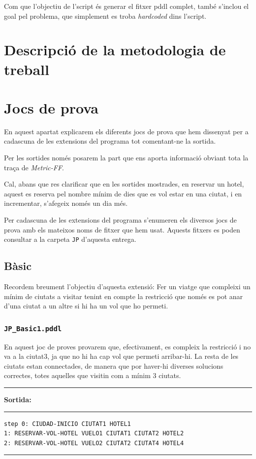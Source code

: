\documentclass[11pt,a4paper]{article}
\begin{document}
Com que l'objectiu de l'script és generar el fitxer pddl complet, també s'inclou el goal pel problema, que simplement es troba \emph{hardcoded} dins l'script.

\section{Descripció de la metodologia de treball}


\section{Jocs de prova}

En aquest apartat explicarem els diferents jocs de prova que hem dissenyat per a cadascuna de les extensions del programa tot comentant-ne la sortida.

Per les sortides només posarem la part que ens aporta informació obviant tota la traça de \emph{Metric-FF}. 

Cal, abans que res clarificar que en les sortides mostrades, en reservar un hotel, aquest es reserva pel nombre mínim de dies que es vol estar en una ciutat, i en incrementar, s'afegeix només un dia més.

Per cadascuna de les extensions del programa s'enumeren els diversos jocs de prova amb els mateixos noms de fitxer que hem usat. Aquests fitxers es poden consultar a la carpeta \texttt{JP} d'aquesta entrega.

\subsection{Bàsic}

Recordem breument l'objectiu d'aquesta extensió: Fer un viatge que compleixi un mínim de ciutats a visitar tenint en compte la restricció que només es pot anar d'una ciutat a un altre si hi ha un vol que ho permeti.

\subsubsection*{\texttt{JP\_Basic1.pddl}}

En aquest joc de proves provarem que, efectivament, es compleix la restricció i no va a la ciutat3, ja que no hi ha cap vol que permeti arribar-hi. La resta de les ciutats estan connectades, de manera que por haver-hi diverses solucions correctes, totes aquelles que visitin com a mínim 3 ciutats.

\begin{samepage}
\medskip
\noindent
\rule{0.1\textwidth}{0.5mm}
\textbf{Sortida:}
\rule{0.76\textwidth}{0.5mm}
\begin{verbatim}
step 0: CIUDAD-INICIO CIUTAT1 HOTEL1
1: RESERVAR-VOL-HOTEL VUELO1 CIUTAT1 CIUTAT2 HOTEL2
2: RESERVAR-VOL-HOTEL VUELO2 CIUTAT2 CIUTAT4 HOTEL4
\end{verbatim}
\rule{\textwidth}{0.5mm}
\medskip
\end{samepage}
\end{document}
